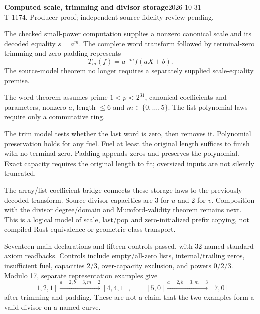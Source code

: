 \documentclass[10pt]{article}
\begin{document}
\textbf{Computed scale, trimming and divisor storage}\hfill2026-10-31\\T-1174. Producer proof; independent source-fidelity review pending.

The checked small-power computation supplies a nonzero canonical scale and its decoded equality $s=a^m$. The complete word transform followed by terminal-zero trimming and zero padding represents
\[
 T_m(f)=a^{-m}f(aX+b).
\]
The source-model theorem no longer requires a separately supplied scale-equality premise.
\begin{center}\end{center}
The word theorem assumes prime $1<p<2^{31}$, canonical coefficients and parameters, nonzero $a$, length $\le6$ and $m\in\{0,\ldots,5\}$. The list polynomial laws require only a commutative ring.

The trim model tests whether the last word is zero, then removes it. Polynomial preservation holds for any fuel. Fuel at least the original length suffices to finish with no terminal zero. Padding appends zeros and preserves the polynomial. Exact capacity requires the original length to fit; oversized inputs are not silently truncated.

The array/list coefficient bridge connects these storage laws to the previously decoded transform. Source divisor capacities are 3 for $u$ and 2 for $v$. Composition with the divisor degree/domain and Mumford-validity theorem remains next. This is a logical model of scale, last/pop and zero-initialized prefix copying, not compiled-Rust equivalence or geometric class transport.

Seventeen main declarations and fifteen controls passed, with 32 named standard-axiom readbacks. Controls include empty/all-zero lists, internal/trailing zeros, insufficient fuel, capacities 2/3, over-capacity exclusion, and powers 0/2/3. Modulo 17, separate representation examples give
\[
 [1,2,1]\xrightarrow{a=2,b=3,m=2}[4,4,1],\qquad
 [5,0]\xrightarrow{a=2,b=3,m=3}[7,0]
\]
after trimming and padding. These are not a claim that the two examples form a valid divisor on a named curve.
\end{document}
